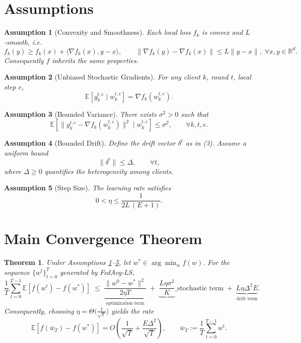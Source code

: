 \documentclass{article}
\newtheorem{theorem}{Theorem}
\newtheorem{assumption}{Assumption}
\newcommand{\E}{\mathbb{E}}
\newcommand{\R}{\mathbb{R}}
\begin{document}
\newpage
\section*{Assumptions}
\begin{assumption}[Convexity and Smoothness]\label{ass:convex}
Each local loss $f_k$ is convex and $L$‑smooth, i.e.
\[
f_k(y)\ge f_k(x)+\langle\nabla f_k(x),y-x\rangle,\qquad
\|\nabla f_k(y)-\nabla f_k(x)\|\le L\|y-x\|,\;\forall x,y\in\R^{d}.
\]
Consequently $f$ inherits the same properties.
\end{assumption}

\begin{assumption}[Unbiased Stochastic Gradients]\label{ass:unbiased}
For any client $k$, round $t$, local step $e$,
\[
\E\!\left[g_{k}^{t,e}\mid w_{k}^{t,e}\right]=\nabla f_k\!\left(w_{k}^{t,e}\right).
\]
\end{assumption}

\begin{assumption}[Bounded Variance]\label{ass:variance}
There exists $\sigma^{2}>0$ such that
\[
\E\!\left[\|g_{k}^{t,e}-\nabla f_k(w_{k}^{t,e})\|^{2}\mid w_{k}^{t,e}\right]\le\sigma^{2},
\qquad\forall k,t,e.
\]
\end{assumption}

\begin{assumption}[Bounded Drift]\label{ass:drift}
Define the drift vector $\delta^{t}$ as in (3).  
Assume a uniform bound
\[
\|\delta^{t}\|\le\Delta,\qquad\forall t,
\]
where $\Delta\ge0$ quantifies the heterogeneity among clients.
\end{assumption}

\begin{assumption}[Step Size]\label{ass:stepsize}
The learning rate satisfies
\[
0<\eta\le \frac{1}{2L\,(E+1)}.
\]
\end{assumption}

\section*{Main Convergence Theorem}
\begin{theorem}\label{thm:conv}
Under Assumptions \ref{ass:convex}–\ref{ass:stepsize}, let $w^{*}\in\arg\min_{w}f(w)$.  
For the sequence $\{w^{t}\}_{t=0}^{T}$ generated by FedAvg-LS,
\[
\frac{1}{T}\sum_{t=0}^{T-1}\E\!\left[f\!\left(w^{t}\right)-f\!\left(w^{*}\right)\right]
\;\le\;
\underbrace{\frac{\|w^{0}-w^{*}\|^{2}}{2\eta T}}_{\text{optimization term}}
\;+\;
\underbrace{ \frac{L\eta\sigma^{2}}{K}}\_{\text{stochastic term}}
\;+\;
\underbrace{L\eta\Delta^{2}E}_{\text{drift term}}.
\tag{4}
\]
Consequently, choosing $\eta = \Theta\!\bigl(\tfrac{1}{\sqrt{T}}\bigr)$ yields the rate
\[
\E\!\left[f(\bar w_{T})-f(w^{*})\right]=O\!\left(\frac{1}{\sqrt{T}}+\frac{E\Delta^{2}}{\sqrt{T}}\right),
\qquad\bar w_{T}:=\frac1T\sum_{t=0}^{T-1}w^{t}.
\]
\end{theorem}
\end{document}
